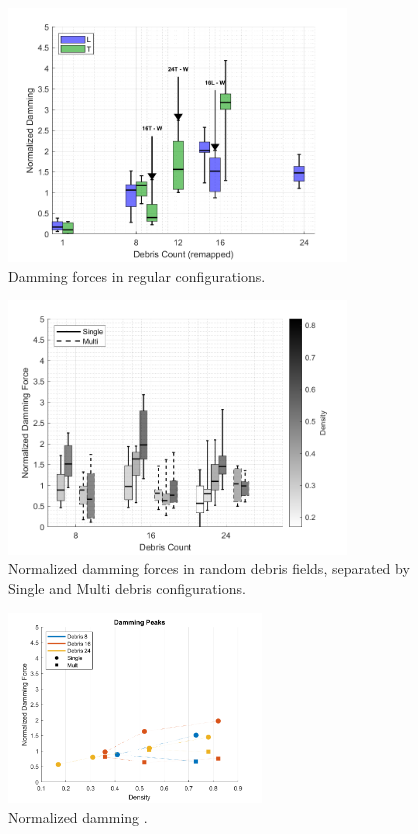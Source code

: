 \documentclass{article}
\begin{document}


\begin{figure}[htbp]
    \centering
    \includegraphics[width=0.8\textwidth]{Damming_Regular_L_T_SplitByTrial_Remapped.png}
    \caption{Damming forces in regular configurations.}
    \label{fig:damming_regular_remap}
\end{figure}
\begin{figure}[htbp]
    \centering
    \includegraphics[width=0.8\textwidth]{Damming_Random_Single_vs_Multi_ByDensityGradient.png}
    \caption{Normalized damming forces in random debris fields, separated by Single and Multi debris configurations.}
    \label{fig:random_damming_gradient}
\end{figure}
\begin{figure}[htbp]
    \centering
    \includegraphics[width=0.6\textwidth]{figures/Damming_Peaks_densities_combined.png}
    \caption{Normalized damming .}
    \label{fig:damming_peaks}
\end{figure}
\end{document}
